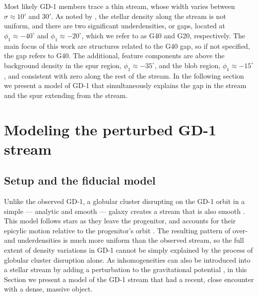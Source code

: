\documentclass[twocolumn]{aastex62}
\begin{document}
Most likely GD-1 members trace a thin stream, whose width varies between $\sigma\approx10'$ and $30'$.
As noted by \citet{pwb}, the stellar density along the stream is not uniform, and there are two significant underdensities, or gaps, located at $\phi_1\approx-40^\circ$ and $\phi_1\approx-20^\circ$, which we refer to as G40 and G20, respectively.
The main focus of this work are structures related to the G40 gap, so if not specified, the gap refers to G40.
The additional, feature components are above the background density in the spur region, $\phi_1\approx-35^\circ$, and the blob region, $\phi_1\approx-15^\circ$, and consistent with zero along the rest of the stream.
In the following section we present a model of GD-1 that simultaneously explains the gap in the stream and the spur extending from the stream.

\section{Modeling the perturbed GD-1 stream}
\subsection{Setup and the fiducial model}
\label{sec:model}
Unlike the observed GD-1, a globular cluster disrupting on the GD-1 orbit in a simple --- analytic and smooth --- galaxy creates a stream that is also smooth \citep{pwb}.
This model follows stars as they leave the progenitor, and accounts for their epicylic motion relative to the progenitor's orbit \citep{kupper2008, kupper2010, fardal2015}.
The resulting pattern of over- and underdensities is much more uniform than the observed stream, so the full extent of density variations in GD-1 cannot be simply explained by the process of globular cluster disruption alone.
As inhomogeneities can also be introduced into a stellar stream by adding a perturbation to the gravitational potential \citep[e.g.,][]{sgv2008}, in this Section we present a model of the GD-1 stream that had a recent, close encounter with a dense, massive object.
\end{document}
